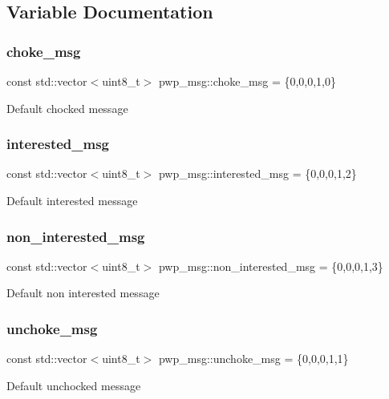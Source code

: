 \subsection{Variable Documentation}
\mbox{\label{namespacepwp__msg_a695ee2efb59a7c258559f19440fe6998}} 
\subsubsection{\texorpdfstring{choke\+\_\+msg}{choke\_msg}}
{\footnotesize\ttfamily const std\+::vector$<$uint8\+\_\+t$>$ pwp\+\_\+msg\+::choke\+\_\+msg = \{0,0,0,1,0\}}

Default chocked message \mbox{\label{namespacepwp__msg_afc68b17ce131c52fa0beb0cc7185778b}} 
\subsubsection{\texorpdfstring{interested\+\_\+msg}{interested\_msg}}
{\footnotesize\ttfamily const std\+::vector$<$uint8\+\_\+t$>$ pwp\+\_\+msg\+::interested\+\_\+msg = \{0,0,0,1,2\}}

Default interested message \mbox{\label{namespacepwp__msg_a16a5f22f784d872342a82af9f6b77830}} 
\subsubsection{\texorpdfstring{non\+\_\+interested\+\_\+msg}{non\_interested\_msg}}
{\footnotesize\ttfamily const std\+::vector$<$uint8\+\_\+t$>$ pwp\+\_\+msg\+::non\+\_\+interested\+\_\+msg = \{0,0,0,1,3\}}

Default non interested message \mbox{\label{namespacepwp__msg_acdc5eb698534e84a15db0e061c511e7c}} 
\subsubsection{\texorpdfstring{unchoke\+\_\+msg}{unchoke\_msg}}
{\footnotesize\ttfamily const std\+::vector$<$uint8\+\_\+t$>$ pwp\+\_\+msg\+::unchoke\+\_\+msg = \{0,0,0,1,1\}}

Default unchocked message 
